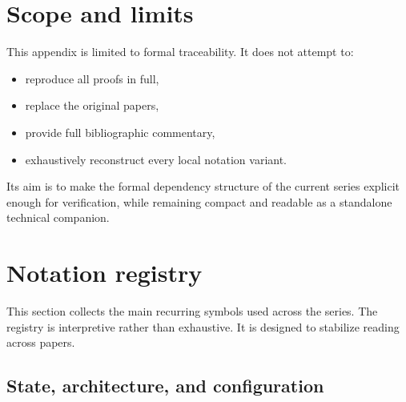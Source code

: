 \documentclass[11pt,a4paper]{article}
\begin{document}
	\section{Scope and limits}
	
	This appendix is limited to formal traceability. It does not attempt to:
	\begin{itemize}[leftmargin=2em]
		\item reproduce all proofs in full,
		\item replace the original papers,
		\item provide full bibliographic commentary,
		\item exhaustively reconstruct every local notation variant.
	\end{itemize}
	
	Its aim is to make the formal dependency structure of the current series explicit enough for
	verification, while remaining compact and readable as a standalone technical companion.
	
	\section{Notation registry}
	
	This section collects the main recurring symbols used across the series. The registry is
	interpretive rather than exhaustive. It is designed to stabilize reading across papers.
	
	\subsection{State, architecture, and configuration}
	
\end{document}
